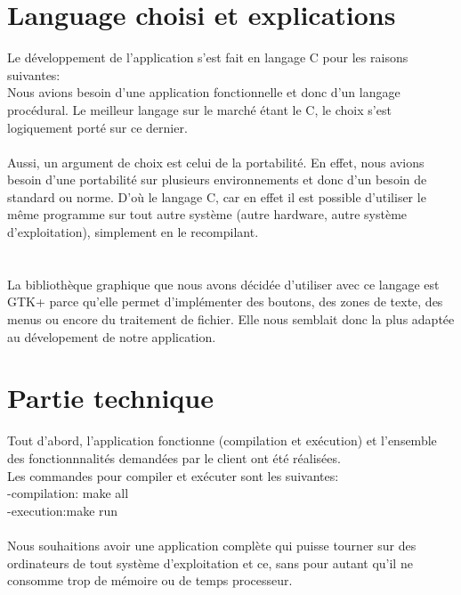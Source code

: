 \documentclass[a4]{article}
\begin{document}
	\section{Language choisi et explications}
	
	Le développement de l'application s'est fait en langage C pour les raisons suivantes: \\
	
  Nous avions besoin d'une application fonctionnelle et donc d'un langage procédural. Le meilleur langage sur le marché
  étant le C, le choix s'est logiquement porté sur ce dernier.\\ \\

  Aussi, un argument de choix est celui de la portabilité. En effet, nous avions besoin d'une portabilité sur plusieurs
  environnements et donc d'un besoin de standard ou norme. D'où le langage C, car en effet il est possible d'utiliser
  le même programme sur tout autre système (autre hardware, autre système d'exploitation), simplement en le recompilant. \\ \\ \\
  

La bibliothèque graphique que nous avons décidée d'utiliser avec ce langage est GTK+ parce qu'elle permet d'implémenter 
des boutons, des zones de texte, des menus ou encore du traitement de fichier.
Elle nous semblait donc la plus adaptée au dévelopement de notre application.

	\section{Partie technique}
	
	Tout d'abord, l'application fonctionne (compilation et exécution) et
	l'ensemble des fonctionnnalités demandées par le client ont été réalisées.\\ 
	Les commandes pour compiler et exécuter sont les suivantes:\\
	-compilation: make all\\
	-execution:make run\\ \\
	
	
	Nous souhaitions avoir une application complète qui puisse tourner sur des ordinateurs 
de tout système d'exploitation et ce, sans pour autant qu’il ne
consomme trop de mémoire ou de temps processeur. \\ \\
	
\end{document}
